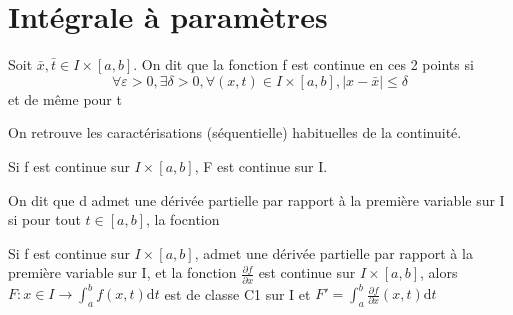 \documentclass[french]{yLectureNote}
\newcommand{\dd}[0]{\mathrm{d}}
\begin{document}
\section{Intégrale à paramètres}
\begin{definition}
Soit \(\bar{x},\bar{t}\in I\times [a,b]\). On dit que la fonction f est continue en ces 2 points si \[\forall \varepsilon >0, \exists \delta >0,\forall (x,t)\in I\times [a,b], |x-\bar{x}|\leq \delta \] et de m\^eme pour t
\end{definition}
On retrouve les caractérisations (séquentielle) habituelles de la continuité.
\begin{theorem}
 Si f est continue sur \(I\times [a,b]\), F est continue sur I.
\end{theorem}
\begin{definition}
On dit que d admet une dérivée partielle par rapport à la première variable sur I si pour tout \(t\in [a,b]\), la focntion \(\)
\end{definition}
\begin{theorem}
 Si f est continue sur \(I\times [a,b]\), admet une dérivée partielle par rapport à la première variable sur I, et la fonction \(\frac{\partial f}{\partial x}\) est continue sur \(I\times [a,b]\), alors \(F : x\in I \to \int^b_a f(x,t)\dd t\) est de classe C1 sur I et \(F' = \int^b_a \frac{\partial f}{\partial x}(x,t)\dd t\)
\end{theorem}
\end{document}
